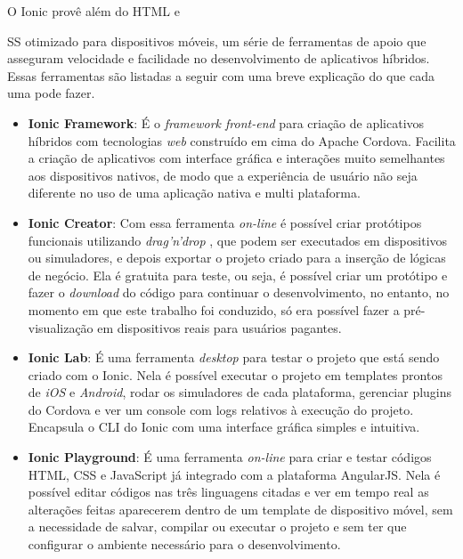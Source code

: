 
O Ionic provê além do HTML e {SS otimizado para dispositivos móveis, um série de ferramentas de 
apoio que asseguram velocidade e facilidade no desenvolvimento de aplicativos híbridos. Essas ferramentas são listadas a seguir 
com uma breve explicação do que cada uma pode fazer.

\begin{itemize}

    \item \textbf{Ionic Framework}: É o \textit{framework front-end} para criação de aplicativos híbridos com tecnologias \textit{web} construído em cima
    do Apache Cordova. Facilita a criação de aplicativos com interface gráfica e interações muito semelhantes aos dispositivos nativos, de modo que 
    a experiência de usuário não seja diferente no uso de uma aplicação nativa e multi plataforma. 
    
    \item \textbf{Ionic Creator}: Com essa ferramenta \textit{on-line} é possível criar protótipos funcionais utilizando \textit{drag'n'drop}
    , que podem ser executados em dispositivos ou simuladores, e depois exportar o projeto criado para a 
    inserção de lógicas de negócio. Ela é gratuita para teste, ou seja, é possível criar um protótipo e fazer o \textit{download}
    do código para continuar o desenvolvimento, no entanto, no momento em que este trabalho foi conduzido, só era possível
    fazer a pré-visualização em dispositivos reais para usuários pagantes.
    
    \item \textbf{Ionic Lab}: É uma ferramenta \textit{desktop} para testar o projeto que está sendo criado com o Ionic. Nela é possível
    executar o projeto em templates prontos de \textit{iOS} e \textit{Android}, rodar os simuladores de cada plataforma,
    gerenciar plugins do Cordova e ver um console com logs relativos à execução do projeto. Encapsula o CLI do Ionic com uma interface gráfica simples
    e intuitiva.
    
    \item \textbf{Ionic Playground}: É uma ferramenta \textit{on-line} para criar e testar códigos HTML, CSS e JavaScript 
    já integrado com a plataforma AngularJS. Nela é possível editar códigos nas três linguagens citadas e ver em tempo real as alterações 
    feitas aparecerem dentro de um template de dispositivo móvel, sem a necessidade de salvar, compilar ou executar o projeto e sem ter que 
    configurar o ambiente necessário para o desenvolvimento. 
    

\end{itemize}}
